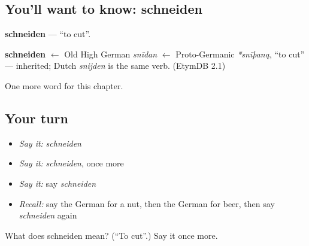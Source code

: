 \subsection*{You'll want to know: schneiden}
\textbf{schneiden} — \textquotedblleft{}to cut\textquotedblright{}.

\begin{cousinweb}
\textbf{schneiden} $\leftarrow$ Old High German \emph{snīdan} $\leftarrow$ Proto-Germanic \emph{*snīþaną}, \textquotedblleft{}to cut\textquotedblright{} — inherited; Dutch \emph{snijden} is the same verb. (EtymDB 2.1)
\end{cousinweb}

\begin{grammarlens}[title={What you've built}]
One more word for this chapter.
\end{grammarlens}

\subsection*{Your turn}
\begin{itemize}
\raggedright
  \item \emph{Say it:} \emph{schneiden}
  \item \emph{Say it:} \emph{schneiden}, once more
  \item \emph{Say it:} say \emph{schneiden}
  \item \emph{Recall:} say the German for a nut, then the German for beer, then say \emph{schneiden} again
\end{itemize}

\begin{tcolorbox}[breakable,colback=teal!4,colframe=teal!35!black,title={Before you move on}]
What does schneiden mean? (\textquotedblleft{}To cut\textquotedblright{}.) Say it once more.
\end{tcolorbox}
